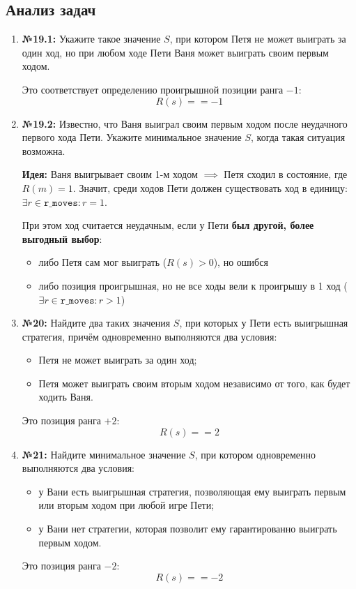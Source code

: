 \documentclass[11pt,a4paper]{article}
\begin{document}
\subsection{Анализ задач}
\begin{enumerate}
    \item \textbf{№19.1:} Укажите такое значение $S$, при котором Петя не может выиграть за один ход, но при любом ходе Пети Ваня может выиграть своим первым ходом.

    Это соответствует определению проигрышной позиции ранга \textbf{$-1$}:
    $$R(s) == -1$$
    
    \item \textbf{№19.2:} Известно, что Ваня выиграл своим первым ходом после неудачного первого хода Пети. Укажите минимальное значение $S$, когда такая ситуация возможна.

    \textbf{Идея:} Ваня выигрывает своим 1-м ходом $\implies$ Петя сходил в состояние, где $R(m) = 1$. Значит, среди ходов Пети должен существовать ход в единицу: $\exists r \in \texttt{r\_moves} : r = 1$.
    
    При этом ход считается неудачным, если у Пети \textbf{был другой, более выгодный выбор}:
    \begin{itemize}
        \item либо Петя сам мог выиграть ($R(s) > 0$), но ошибся
        \item либо позиция проигрышная, но не все ходы вели к проигрышу в 1 ход ($\exists r \in \texttt{r\_moves} : r > 1$)
    \end{itemize}
    
    \item \textbf{№20:} Найдите два таких значения $S$, при которых у Пети есть выигрышная стратегия, причём одновременно выполняются два условия:
    \begin{itemize}
        \item Петя не может выиграть за один ход;
        \item Петя может выиграть своим вторым ходом независимо от того, как будет ходить Ваня.
    \end{itemize}

    Это позиция ранга \textbf{$+2$}:
    $$R(s) == 2$$

    \item \textbf{№21:} Найдите минимальное значение $S$, при котором одновременно выполняются два условия:
    \begin{itemize}
        \item у Вани есть выигрышная стратегия, позволяющая ему выиграть первым или вторым ходом при любой игре Пети;
        \item у Вани нет стратегии, которая позволит ему гарантированно выиграть первым ходом.
    \end{itemize}

    Это позиция ранга \textbf{$-2$}:
    $$R(s) == -2$$
\end{enumerate}
\end{document}
